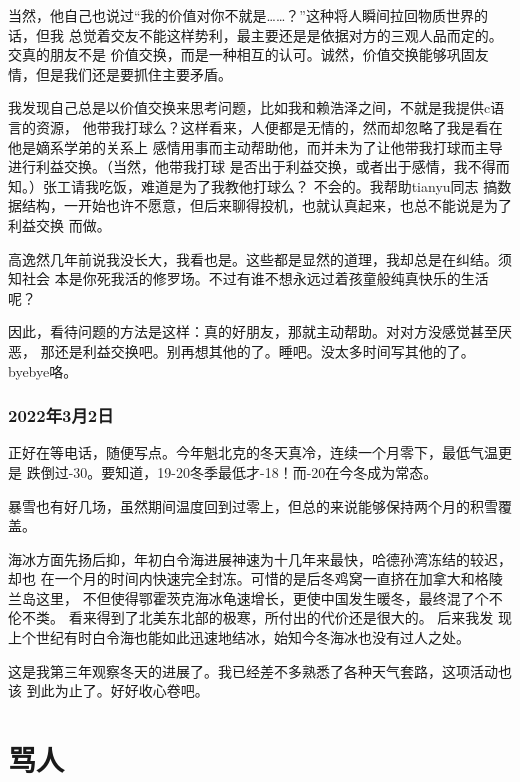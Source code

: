 \documentclass{ctexart}
\begin{document}
    当然，他自己也说过“我的价值对你不就是……？”这种将人瞬间拉回物质世界的话，但我
    总觉着交友不能这样势利，最主要还是是依据对方的三观人品而定的。交真的朋友不是
    价值交换，而是一种相互的认可。诚然，价值交换能够巩固友情，但是我们还是要抓住主要矛盾。

    我发现自己总是以价值交换来思考问题，比如我和赖浩泽之间，不就是我提供c语言的资源，
    他带我打球么？这样看来，人便都是无情的，然而却忽略了我是看在他是嫡系学弟的关系上
    感情用事而主动帮助他，而并未为了让他带我打球而主导进行利益交换。（当然，他带我打球
    是否出于利益交换，或者出于感情，我不得而知。）张工请我吃饭，难道是为了我教他打球么？
    不会的。我帮助tianyu同志
    搞数据结构，一开始也许不愿意，但后来聊得投机，也就认真起来，也总不能说是为了利益交换
    而做。

    高逸然几年前说我没长大，我看也是。这些都是显然的道理，我却总是在纠结。须知社会
    本是你死我活的修罗场。不过有谁不想永远过着孩童般纯真快乐的生活呢？

    因此，看待问题的方法是这样：真的好朋友，那就主动帮助。对对方没感觉甚至厌恶，
    那还是利益交换吧。别再想其他的了。睡吧。没太多时间写其他的了。byebye咯。
    \section{2022年3月2日}
    正好在等电话，随便写点。今年魁北克的冬天真冷，连续一个月零下，最低气温更是
    跌倒过-30。要知道，19-20冬季最低才-18！而-20在今冬成为常态。

    暴雪也有好几场，虽然期间温度回到过零上，但总的来说能够保持两个月的积雪覆盖。

    海冰方面先扬后抑，年初白令海进展神速为十几年来最快，哈德孙湾冻结的较迟，却也
    在一个月的时间内快速完全封冻。可惜的是后冬鸡窝一直挤在加拿大和格陵兰岛这里，
    不但使得鄂霍茨克海冰龟速增长，更使中国发生暖冬，最终混了个不伦不类。
    看来得到了北美东北部的极寒，所付出的代价还是很大的。 后来我发
    现上个世纪有时白令海也能如此迅速地结冰，始知今冬海冰也没有过人之处。
    
    这是我第三年观察冬天的进展了。我已经差不多熟悉了各种天气套路，这项活动也该
    到此为止了。好好收心卷吧。

    \part{骂人}
\end{document}
